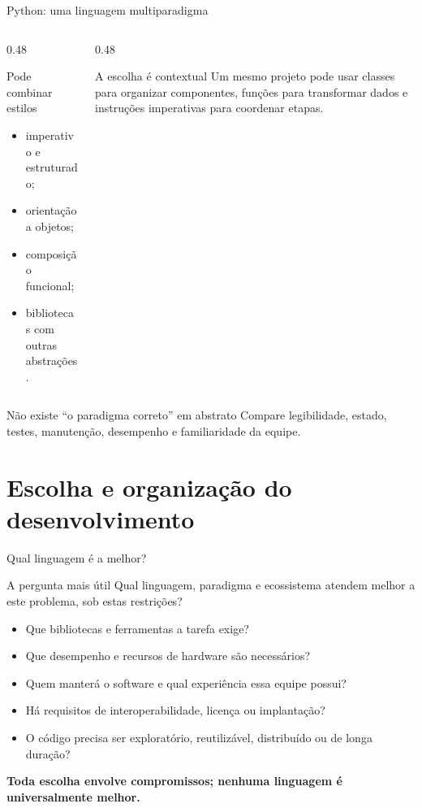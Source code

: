 \documentclass[aspectratio=169,10pt]{beamer}
\begin{document}
\begin{frame}{Python: uma linguagem multiparadigma}
  \begin{columns}[T,onlytextwidth]
    \begin{column}{0.48\textwidth}
      \begin{block}{Pode combinar estilos}
        \begin{itemize}
          \item imperativo e estruturado;
          \item orientação a objetos;
          \item composição funcional;
          \item bibliotecas com outras abstrações.
        \end{itemize}
      \end{block}
    \end{column}
    \begin{column}{0.48\textwidth}
      \begin{exampleblock}{A escolha é contextual}
        Um mesmo projeto pode usar classes para organizar componentes, funções para transformar dados e instruções imperativas para coordenar etapas.
      \end{exampleblock}
    \end{column}
  \end{columns}
  \begin{alertblock}{Não existe “o paradigma correto” em abstrato}
    Compare legibilidade, estado, testes, manutenção, desempenho e familiaridade da equipe.
  \end{alertblock}
\end{frame}

\section{Escolha e organização do desenvolvimento}

\begin{frame}{Qual linguagem é a melhor?}
  \begin{block}{A pergunta mais útil}
    Qual linguagem, paradigma e ecossistema atendem melhor a este problema, sob estas restrições?
  \end{block}
  \begin{itemize}
    \item Que bibliotecas e ferramentas a tarefa exige?
    \item Que desempenho e recursos de hardware são necessários?
    \item Quem manterá o software e qual experiência essa equipe possui?
    \item Há requisitos de interoperabilidade, licença ou implantação?
    \item O código precisa ser exploratório, reutilizável, distribuído ou de longa duração?
  \end{itemize}
  \centering\textbf{Toda escolha envolve compromissos; nenhuma linguagem é universalmente melhor.}
\end{frame}
\end{document}
